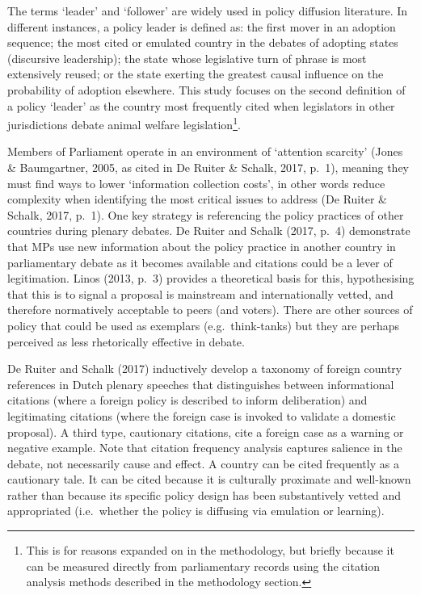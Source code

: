 \documentclass[twocolumn, 10pt, a4paper]{article}
\begin{document}
The terms `leader' and `follower' are widely used in policy diffusion literature. In
different instances, a policy leader is defined as: the first mover in an adoption
sequence; the most cited or emulated country in the debates of adopting states
(discursive leadership); the state whose legislative turn of phrase is most
extensively reused; or the state exerting the greatest causal influence on the
probability of adoption elsewhere. This study focuses on the second definition of a
policy `leader' as the country most frequently cited when legislators in other
jurisdictions debate animal welfare legislation\footnote{This is for reasons expanded
on in the methodology, but briefly because it can be measured directly from
parliamentary records using the citation analysis methods described in the
methodology section.}.

Members of Parliament operate in an environment of `attention scarcity' (Jones \&
Baumgartner, 2005, as cited in De Ruiter \& Schalk, 2017, p.~1), meaning they must
find ways to lower `information collection costs', in other words reduce complexity
when identifying the most critical issues to address (De Ruiter \& Schalk, 2017,
p.~1). One key strategy is referencing the policy practices of other countries during
plenary debates. De Ruiter and Schalk (2017, p.~4) demonstrate that MPs use new
information about the policy practice in another country in parliamentary debate as
it becomes available and citations could be a lever of legitimation. Linos (2013,
p.~3) provides a theoretical basis for this, hypothesising that this is to signal a
proposal is mainstream and internationally vetted, and therefore normatively
acceptable to peers (and voters). There are other sources of policy that could be
used as exemplars (e.g.\ think-tanks) but they are perhaps perceived as less
rhetorically effective in debate.

De Ruiter and Schalk (2017) inductively develop a taxonomy of foreign country
references in Dutch plenary speeches that distinguishes between informational
citations (where a foreign policy is described to inform deliberation) and
legitimating citations (where the foreign case is invoked to validate a domestic
proposal). A third type, cautionary citations, cite a foreign case as a warning or
negative example. Note that citation frequency analysis captures salience in the
debate, not necessarily cause and effect. A country can be cited frequently as a
cautionary tale. It can be cited because it is culturally proximate and well-known
rather than because its specific policy design has been substantively vetted and
appropriated (i.e.\ whether the policy is diffusing via emulation or learning).
\end{document}
